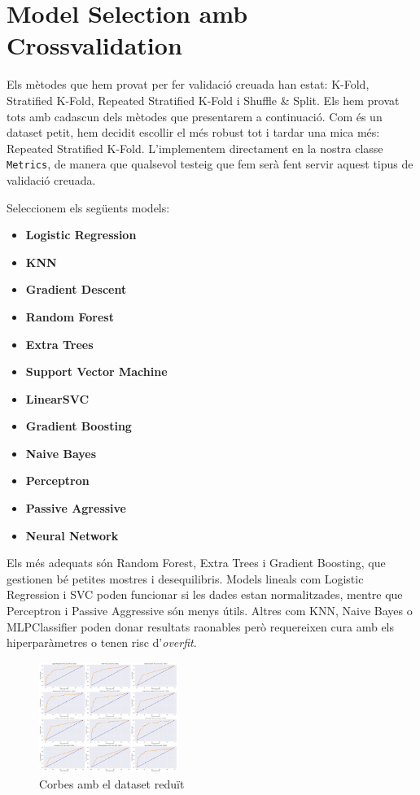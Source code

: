 \documentclass[9pt,a4paper,twoside]{tau-class/tau}
\begin{document}
\section{Model Selection amb Crossvalidation}

Els mètodes que hem provat per fer validació creuada han estat: K-Fold, Stratified K-Fold, Repeated Stratified K-Fold i Shuffle \& Split. Els hem provat tots amb cadascun dels mètodes que presentarem a continuació. Com és un dataset petit, hem decidit escollir el més robust tot i tardar una mica més: Repeated Stratified K-Fold. L'implementem directament en la nostra classe \texttt{Metrics}, de manera que qualsevol testeig que fem serà fent servir aquest tipus de validació creuada.

Seleccionem els següents models:
\begin{itemize}
    \item \textbf{Logistic Regression}
    \item \textbf{KNN}
    \item \textbf{Gradient Descent}
    \item \textbf{Random Forest}
    \item \textbf{Extra Trees}
    \item \textbf{Support Vector Machine}
    \item \textbf{LinearSVC}
    \item \textbf{Gradient Boosting}
    \item \textbf{Naive Bayes}
    \item \textbf{Perceptron}
    \item \textbf{Passive Agressive}
    \item \textbf{Neural Network}
\end{itemize}

Els més adequats són Random Forest, Extra Trees i Gradient Boosting, que gestionen bé petites mostres i desequilibris. Models lineals com Logistic Regression i SVC poden funcionar si les dades estan normalitzades, mentre que Perceptron i Passive Aggressive són menys útils. Altres com KNN, Naive Bayes o MLPClassifier poden donar resultats raonables però requereixen cura amb els hiperparàmetres o tenen risc d’\textit{overfit}.



\begin{figure}[H]
    \centering
    \includegraphics[width=0.4\textwidth]{figures/red_dims.png}
    \caption{Corbes amb el dataset reduït}
    \label{fig:exemple}
\end{figure}
\end{document}
